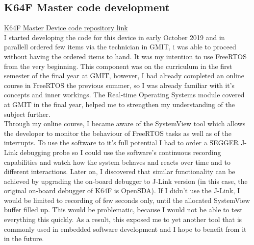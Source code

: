 \documentclass[12pt,a4paper]{article}
\begin{document}
		\subsection{K64F Master code development}
		\href{https://github.com/zedd-1983/project_journal/tree/bt2}{K64F Master Device code repository link}\\
		
		I started developing the code for this device in early October 2019 and in parallell ordered few items via the technician in GMIT, i was able to proceed without having the ordered items to hand.  It was my intention to use FreeRTOS from the very beginning. This component was on the curriculum in the first semester of the final year at GMIT, however, I had already completed an online course in FreeRTOS the previous summer, so I was already familiar with it's concepts and inner workings. The Real-time Operating Systems module covered at GMIT in the final year, helped me to strengthen my understanding of the subject further.\\
		
		Through my online course, I became aware of the SystemView tool which allows the developer to monitor the behaviour of FreeRTOS tasks as well as of the interrupts. To use the software to it's full potential I had to order a SEGGER J-Link debugging probe so I could use the software's continuous recording capabilities and watch how the system behaves and reacts over time and to different interactions. Later on, I discovered that similar functionality can be achieved by upgrading the on-board debugger to J-Link version (in this case, the original on-board debugger of K64F is OpenSDA). If I didn't use the J-Link, I would be limited to recording of few seconds only, until the allocated SystemView buffer filled up. This would be problematic, because I would not be able to test everything this quickly. As a result, this exposed me to yet another tool that is commonly used in embedded software development and I hope to benefit from it in the future.\\
		
\end{document}
